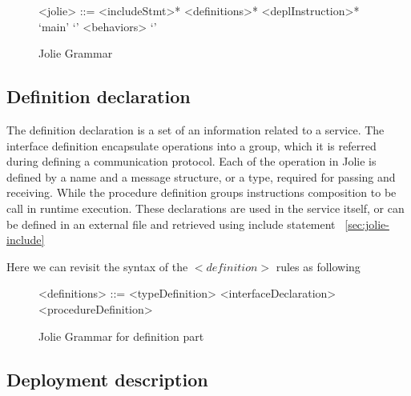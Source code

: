 \begin{figure}[h]
    \begin{framed}
        \begin{grammar}
            <jolie> ::= <includeStmt>* <definitions>* <deplInstruction>*  `main' `{' <behaviors> `}'
        \end{grammar}
    \end{framed}
    \caption{Jolie Grammar}
    \label{fig:JolieGrammar}
\end{figure}

\FloatBarrier

\subsection{Definition declaration}

The definition declaration is a set of an information related to a service. The interface definition encapsulate operations into a group, which it is referred during defining a communication protocol. Each of the operation in Jolie is defined by a name and a message structure, or a type, required for passing and receiving. While the procedure definition groups instructions composition to be call in runtime execution. These declarations are used in the service itself, or can be defined in an external file and retrieved using include statement ~\ref{sec:jolie-include}







Here we can revisit the syntax of the \(<definition>\) rules as following

\begin{figure}[h]
    \begin{framed}
        \begin{grammar}
            <definitions> ::= <typeDefinition>
            \alt <interfaceDeclaration>
            \alt <procedureDefinition>
        \end{grammar}
    \end{framed}
    \caption{Jolie Grammar for definition part}
    \label{fig:jolie-definition}
\end{figure}

\subsection{Deployment description}

